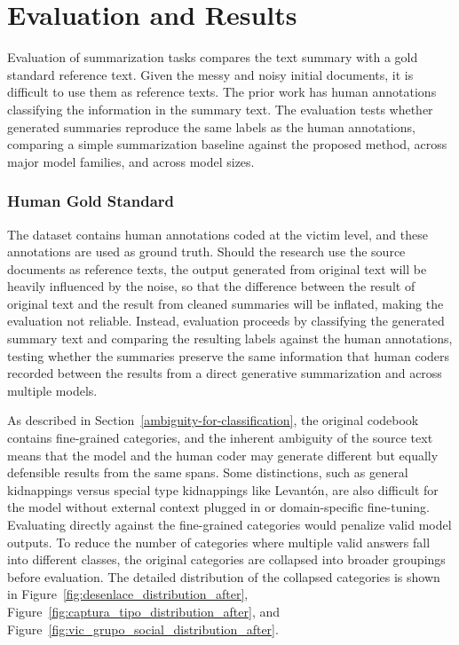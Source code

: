 \documentclass{article}
\begin{document}


\section{Evaluation and Results}\label{eval_results}

Evaluation of summarization tasks compares the
text summary with a gold standard reference text. Given the messy and noisy initial documents, it is difficult to
use them as reference texts.  The prior work has human
annotations classifying the information in the 
summary text. The evaluation tests whether generated summaries reproduce
the same labels as the human annotations, comparing a simple
summarization baseline against the proposed method, across major model
families, and across model sizes.

\subsubsection{Human Gold Standard}\label{human-gold-standard}

The dataset contains human annotations coded at the victim level, and these annotations are used as ground truth. Should the research use the source documents as reference texts, the output generated from original text will be heavily influenced by the noise, so that the difference between the result of original text and the result from cleaned summaries will be inflated, making the evaluation not reliable. Instead, evaluation proceeds by classifying the generated summary text and comparing the resulting labels against the human annotations, testing whether the summaries preserve the same information that human coders recorded between the results from a direct generative summarization and across multiple models.

As described in Section~\ref{ambiguity-for-classification}, the original codebook contains fine-grained categories, and the inherent ambiguity of the source text means that the model and the human coder may generate different but equally defensible results from the same spans. Some distinctions, such as general kidnappings versus special type kidnappings like Levantón, are also difficult for the model without external context plugged in or domain-specific fine-tuning. Evaluating directly against the fine-grained categories would penalize valid model outputs. To reduce the number of categories where multiple valid answers fall into different classes, the original categories are collapsed into broader groupings before evaluation. The detailed distribution of the collapsed categories is shown in Figure~\ref{fig:desenlace_distribution_after}, Figure~\ref{fig:captura_tipo_distribution_after}, and Figure~\ref{fig:vic_grupo_social_distribution_after}.
\end{document}
